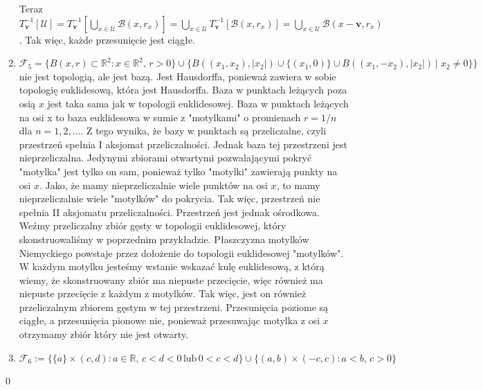 \documentclass{article}
\theoremstyle{definition}%
\theoremstyle{theorem}
\renewenvironment{proof}{{\bfseries Rozwiązanie}}{\qed}
\newcommand{\R}{\mathbb{R}} %
\newcommand{\sF}{\mathcal{F}} %
\newcommand{\oU}{\mathcal{U}}
\newcommand{\oB}{\mathcal{B}}
\newcommand{\vv}{\mathbf{v}}
\begin{document}
\begin{proof}
\begin{enumerate}
Teraz $T_{\vv}^{-1}[\oU]=T_{\vv}^{-1}[\bigcup_{x\in\oU}\oB(x,r_x)]=\bigcup_{x\in\oU}T_{\vv}^{-1}[\oB(x,r_x)]=\bigcup_{x\in\oU}\oB(x-\vv,r_x)$. Tak więc, każde przesunięcie jest ciągłe.
\item $\sF_5=\{B(x,r)\subset \R^2\colon  x\in\R^2,\,  r>0 \}\cup \{B((x_1,x_2),|x_2|)\cup \{(x_1,0)\}\cup B((x_1,- x_2),|x_2|)\, |\,  \, x_2\neq 0\}\}$ nie jest topologią, ale jest bazą. Jest Hausdorffa, ponieważ zawiera w sobie topologię euklidesową, która jest Hausdorffa. Baza w punktach leżących poza osią $x$ jest taka sama jak w topologii euklidesowej. Baza w punktach leżących na osi x to baza euklidesowa w sumie z "motylkami" o promienach $r=1/n$ dla $n=1,2,...$. Z tego wynika, że bazy w punktach są przeliczalne, czyli przestrzeń spełnia I aksjomat przeliczalności.  Jednak baza tej przestrzeni jest nieprzeliczalna. Jedynymi zbiorami otwartymi pozwalającymi pokryć "motylka" jest tylko on sam, ponieważ tylko "motylki" zawierają punkty na osi $x$. Jako, że mamy nieprzeliczalnie wiele punktów na osi $x$, to mamy nieprzeliczalnie wiele "motylków" do pokrycia. Tak więc, przestrzeń nie spełnia II aksjomatu przeliczalności. Przestrzeń jest jednak ośrodkowa. Weźmy przeliczalny zbiór gęsty w topologii euklidesowej, który skonstruowaliśmy w poprzednim przykładzie. Płaszczyzna motylków Niemyckiego powstaje przez dołożenie do topologii euklidesowej "motylków". W każdym motylku jesteśmy wstanie wskazać kulę euklidesową, z którą wiemy, że skonstruowany zbiór ma niepuste przecięcie, więc również ma niepuste przecięcie z każdym z motylków. Tak więc, jest on również przeliczalnym zbiorem gęstym w tej przestrzeni. Przesunięcia poziome są ciągłe, a przesunięcia pionowe nie, ponieważ przesuwając motylka z osi $x$ otrzymamy zbiór który nie jest otwarty.
\item $\sF_6:=\{\{a\}\times (c,d) \colon a\in\R,\, c<d<0\, \text{lub}\, 0<c<d\}\cup\{ (a,b)\times (-c,c)  \colon a < b,\, c >0\}$


\end{enumerate}
\end{proof}
	
\end{document}
